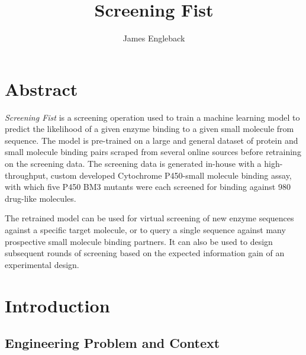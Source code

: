 \documentclass{article}
\begin{document}
\title{\textbf{Screening Fist}}
\author{James Engleback}
\maketitle
\tableofcontents

\section{Abstract}
\textit{Screening Fist} is a screening operation used to train a machine learning model to predict the likelihood of a given enzyme binding to a given small molecule from sequence.
The model is pre-trained on a large and general dataset of protein and small molecule binding pairs scraped from several online sources before retraining on the screening data.
The screening data is generated in-house with a high-throughput, custom developed Cytochrome P450-small molecule binding assay, with which five P450 BM3 mutants were each screened for binding against 980 drug-like molecules.
\par
The retrained model can be used for virtual screening of new enzyme sequences against a specific target molecule, or to query a single sequence against many prospective small molecule binding partners.
It can also be used to design subsequent rounds of screening based on the expected information gain of an experimental design.

\section{Introduction}

\subsection{Engineering Problem and Context}
\end{document}
